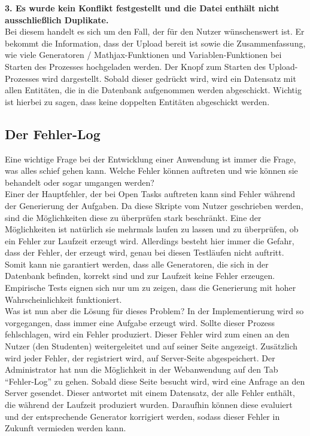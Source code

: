 \noindent \textbf{3. Es wurde kein Konflikt festgestellt und die Datei enthält nicht ausschließlich Duplikate.} \\
Bei diesem handelt es sich um den Fall, der für den Nutzer wünschenswert ist. Er bekommt die Information, dass der Upload bereit ist sowie die Zusammenfassung, wie viele Generatoren / Mathjax-Funktionen und Variablen-Funktionen bei Starten des Prozesses hochgeladen werden. Der Knopf zum Starten des Upload-Prozesses wird dargestellt. Sobald dieser gedrückt wird, wird ein Datensatz mit allen Entitäten, die in die Datenbank aufgenommen werden abgeschickt. Wichtig ist hierbei zu sagen, dass keine doppelten Entitäten abgeschickt werden.\\



\subsection{Der Fehler-Log}

Eine wichtige Frage bei der Entwicklung einer Anwendung ist immer die Frage, was alles schief gehen kann. Welche Fehler können auftreten und wie können sie behandelt oder sogar umgangen werden? \\
Einer der Hauptfehler, der bei Open Tasks auftreten kann sind Fehler während der Generierung der Aufgaben. Da diese Skripte vom Nutzer geschrieben werden, sind die Möglichkeiten diese zu überprüfen stark beschränkt. Eine der Möglichkeiten ist natürlich sie mehrmals laufen zu lassen und zu überprüfen, ob ein Fehler zur Laufzeit erzeugt wird. Allerdings besteht hier immer die Gefahr, dass der Fehler, der erzeugt wird, genau bei diesen Testläufen nicht auftritt. Somit kann nie garantiert werden, dass alle Generatoren, die sich in der Datenbank befinden, korrekt sind und zur Laufzeit keine Fehler erzeugen. Empirische Tests eignen sich nur um zu zeigen, dass die Generierung mit hoher Wahrscheinlichkeit funktioniert.  \\

Was ist nun aber die Lösung für dieses Problem? In der Implementierung wird so vorgegangen, dass immer eine Aufgabe erzeugt wird. Sollte dieser Prozess fehlschlagen, wird ein Fehler produziert. Dieser Fehler wird zum einen an den Nutzer (den Studenten) weitergeleitet und auf seiner Seite angezeigt. Zusätzlich wird jeder Fehler, der registriert wird, auf Server-Seite abgespeichert. Der Administrator hat nun die Möglichkeit in der Webanwendung auf den Tab ``Fehler-Log'' zu gehen. Sobald diese Seite besucht wird, wird eine Anfrage an den Server gesendet. Dieser antwortet mit einem Datensatz, der alle Fehler enthält, die während der Laufzeit produziert wurden. Daraufhin können diese evaluiert und der entsprechende Generator korrigiert werden, sodass dieser Fehler in Zukunft vermieden werden kann. \\

